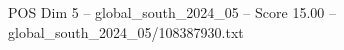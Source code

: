 \begin{textsample}{POS Dim 5 – global\_south\_2024\_05 – Score 15.00 – global\_south\_2024\_05/108387930.txt}
\end{textsample}
